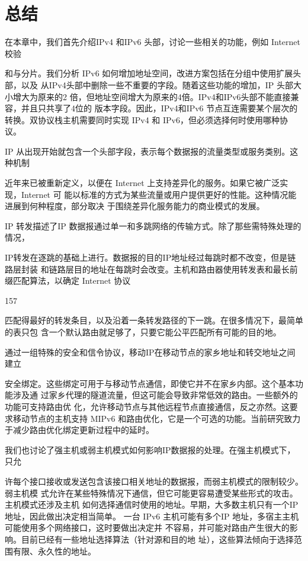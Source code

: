\section{总结}
在本章中，我们首先介绍IPv4 和IPv6 头部，讨论一些相关的功能，例如 Internet 校验

和与分片。我们分析 IPv6 如何增加地址空间，改进方案包括在分组中使用扩展头部，以及
从IPv4头部中删除一些不重要的字段。随着这些功能的增加，IP 头部大小增大为原来的2
倍，但地址空间增大为原来的4倍。IPv4和IPv6头部不能直接兼容，并且只共享了4位的
版本字段。因此，IPv4和IPv6 节点互连需要某个层次的转换。双协议栈主机需要同时实现
IPv4 和 IPv6，但必须选择何时使用哪种协议。

IP 从出现开始就包含一个头部字段，表示每个数据报的流量类型或服务类别。这种机制

近年来已被重新定义，以便在 Internet 上支持差异化的服务。如果它被广泛实现，Internet 可
能以标准的方式为某些流量或用户提供更好的性能。这种情况能进展到何种程度，部分取决
于围绕差异化服务能力的商业模式的发展。

IP 转发描述了IP 数据报通过单一和多跳网络的传输方式。除了那些需特殊处理的情况，

IP转发在逐跳的基础上进行。数据报的目的IP地址经过每跳时都不改变，但是链路层封装
和链路层目的地址在每跳时会改变。主机和路由器使用转发表和最长前缀匹配算法，以确定
Internet 协议

157

匹配得最好的转发条目，以及沿着一条转发路径的下一跳。在很多情况下，最简单的表只包
含一个默认路由就足够了，只要它能公平匹配所有可能的目的地。

通过一组特殊的安全和信令协议，移动IP在移动节点的家乡地址和转交地址之间建立

安全绑定。这些绑定可用于与移动节点通信，即使它并不在家乡内部。这个基本功能涉及通
过家乡代理的隧道流量，但这可能会导致非常低效的路由。一些额外的功能可支持路由优
化，允许移动节点与其他远程节点直接通信，反之亦然。这要求移动节点的主机支持 MIPv6
和路由优化，它是一个可选的功能。当前研究致力于减少路由优化绑定更新过程中的延时。

我们也讨论了强主机或弱主机模式如何影响IP数据报的处理。在强主机模式下，只允

许每个接口接收或发送包含该接口相关地址的数据报，而弱主机模式的限制较少。弱主机模
式允许在某些特殊情况下通信，但它可能更容易遭受某些形式的攻击。主机模式还涉及主机
如何选择通信时使用的地址。早期，大多数主机只有一个IP地址，因此做出决定相当简单。
一台 IPv6 主机可能有多个IP 地址，多宿主主机可能使用多个网络接口，这时要做出决定并
不容易，并可能对路由产生很大的影响。目前已经有一些地址选择算法（针对源和目的地
址），这些算法倾向于选择范围有限、永久性的地址。

